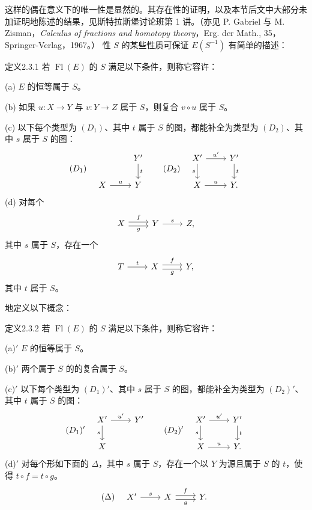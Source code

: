 这样的偶在意义下的唯一性是显然的。其存在性的证明，以及本节后文中大部分未加证明地陈述的结果，见斯特拉斯堡讨论班第 1 讲。（亦见 P. Gabriel 与 M. Zisman，\emph{Calculus of fractions and homotopy theory}，Erg. der Math., 35，Springer-Verlag，1967。）
性 $S$ 的某些性质可保证 $E(S^{-1})$ 有简单的描述：
\begin{SGAresult}{定义}{2.3.1}
若 $\operatorname{Fl}(E)$ 的 $S$ 满足以下条件，则称它容许：

(a) $E$ 的恒等属于 $S$。

(b) 如果 $u:X\to Y$ 与 $v:Y\to Z$ 属于 $S$，则复合 $v\circ u$ 属于 $S$。

(c) 以下每个类型为 $(D_1)$、其中 $t$ 属于 $S$ 的图，都能补全为类型为 $(D_2)$、其中 $s$ 属于 $S$ 的图：
\[
(D_1)\quad\begin{tikzcd}&Y'\arrow[d,"t"]\\X\arrow[r,"u"]&Y\end{tikzcd}
\qquad
(D_2)\quad\begin{tikzcd}X'\arrow[r,"u'"]\arrow[d,"s"']&Y'\arrow[d,"t"]\\X\arrow[r,"u"]&Y.\end{tikzcd}
\]
(d) 对每个
\[
\begin{tikzcd}X\arrow[r,shift left,"f"]\arrow[r,shift right,"g"']&Y\arrow[r,"s"]&Z,\end{tikzcd}
\]
其中 $s$ 属于 $S$，存在一个
\[
\begin{tikzcd}T\arrow[r,"t"]&X\arrow[r,shift left,"f"]\arrow[r,shift right,"g"']&Y,\end{tikzcd}
\]
其中 $t$ 属于 $S$。
\end{SGAresult}
地定义以下概念：
\begin{SGAresult}{定义}{2.3.2}
若 $\operatorname{Fl}(E)$ 的 $S$ 满足以下条件，则称它容许：

(a)$'$ $E$ 的恒等属于 $S$。

(b)$'$ 两个属于 $S$ 的的复合属于 $S$。

(c)$'$ 以下每个类型为 $(D_1)'$、其中 $s$ 属于 $S$ 的图，都能补全为类型为 $(D_2)'$、其中 $t$ 属于 $S$ 的图：
\[
(D_1)'\quad\begin{tikzcd}X'\arrow[r,"u'"]\arrow[d,"s"']&Y'\\X&\end{tikzcd}
\qquad
(D_2)'\quad\begin{tikzcd}X'\arrow[r,"u'"]\arrow[d,"s"']&Y'\arrow[d,"t"]\\X\arrow[r,"u"]&Y.\end{tikzcd}
\]
(d)$'$ 对每个形如下面的 $\Delta$，其中 $s$ 属于 $S$，存在一个以 $Y$ 为源且属于 $S$ 的 $t$，使得 $t\circ f=t\circ g$。
\[
(\Delta)\quad\begin{tikzcd}X'\arrow[r,"s"]&X\arrow[r,shift left,"f"]\arrow[r,shift right,"g"']&Y.\end{tikzcd}
\]
\end{SGAresult}
